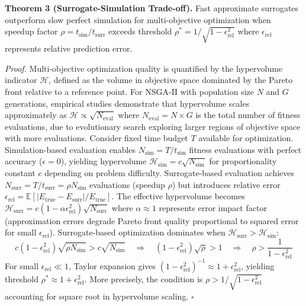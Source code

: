 \documentclass[pdflatex,sn-nature]{sn-jnl}%
\begin{document}
\textbf{Theorem 3 (Surrogate-Simulation Trade-off).} Fast approximate surrogates outperform slow perfect simulation for multi-objective optimization when speedup factor $\rho = t_{\text{sim}}/t_{\text{surr}}$ exceeds threshold $\rho^* = 1/\sqrt{1 - \epsilon_{\text{rel}}^2}$ where $\epsilon_{\text{rel}}$ represents relative prediction error.

\textit{Proof.} Multi-objective optimization quality is quantified by the hypervolume indicator $\mathcal{H}$, defined as the volume in objective space dominated by the Pareto front relative to a reference point. For NSGA-II with population size $N$ and $G$ generations, empirical studies\cite{Daulton2022moo} demonstrate that hypervolume scales approximately as $\mathcal{H} \propto \sqrt{N_{\text{eval}}}$ where $N_{\text{eval}} = N \times G$ is the total number of fitness evaluations, due to evolutionary search exploring larger regions of objective space with more evaluations. Consider fixed time budget $T$ available for optimization. Simulation-based evaluation enables $N_{\text{sim}} = T / t_{\text{sim}}$ fitness evaluations with perfect accuracy ($\epsilon = 0$), yielding hypervolume $\mathcal{H}_{\text{sim}} = c\sqrt{N_{\text{sim}}}$ for proportionality constant $c$ depending on problem difficulty. Surrogate-based evaluation achieves $N_{\text{surr}} = T / t_{\text{surr}} = \rho N_{\text{sim}}$ evaluations (speedup $\rho$) but introduces relative error $\epsilon_{\text{rel}} = \mathbb{E}[|E_{\text{true}} - E_{\text{surr}}|/E_{\text{true}}]$. The effective hypervolume becomes $\mathcal{H}_{\text{surr}} = c(1 - \alpha \epsilon_{\text{rel}}^2) \sqrt{N_{\text{surr}}}$ where $\alpha \approx 1$ represents error impact factor (approximation errors degrade Pareto front quality proportional to squared error for small $\epsilon_{\text{rel}}$). Surrogate-based optimization dominates when $\mathcal{H}_{\text{surr}} > \mathcal{H}_{\text{sim}}$:
\begin{equation}
c(1 - \epsilon_{\text{rel}}^2)\sqrt{\rho N_{\text{sim}}} > c\sqrt{N_{\text{sim}}} \quad \Rightarrow \quad (1-\epsilon_{\text{rel}}^2)\sqrt{\rho} > 1 \quad \Rightarrow \quad \rho > \frac{1}{1-\epsilon_{\text{rel}}^2}
\end{equation}
For small $\epsilon_{\text{rel}} \ll 1$, Taylor expansion gives $(1-\epsilon_{\text{rel}}^2)^{-1} \approx 1 + \epsilon_{\text{rel}}^2$, yielding threshold $\rho^* \approx 1 + \epsilon_{\text{rel}}^2$. More precisely, the condition is $\rho > 1/\sqrt{1-\epsilon_{\text{rel}}^2}$ accounting for square root in hypervolume scaling. $\square$
\end{document}
